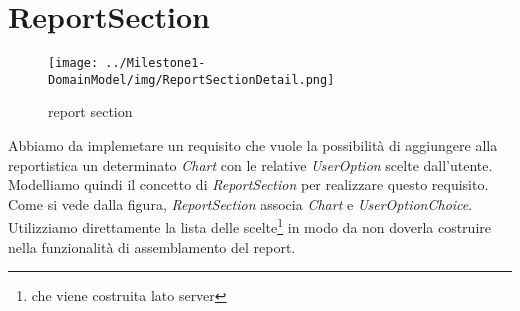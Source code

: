\section{ReportSection}
\label{sec:reportSection}

\begin{figure}[h!] 
	\centering
	\texttt{[image: ../Milestone1-DomainModel/img/ReportSectionDetail.png]}
	\caption{report section}
	\label{fig:reportSection} 
\end{figure}

Abbiamo da implemetare un requisito che vuole la possibilit\`a di aggiungere
alla reportistica un determinato \emph{Chart} con le relative \emph{UserOption}
scelte dall'utente. Modelliamo quindi il concetto di \emph{ReportSection} per
realizzare questo requisito. Come si vede dalla figura, \emph{ReportSection}
associa \emph{Chart} e \emph{UserOptionChoice}. Utilizziamo direttamente la
lista delle scelte\footnote{che viene costruita lato server} in modo da non
doverla costruire nella funzionalit\`a di assemblamento del report.

